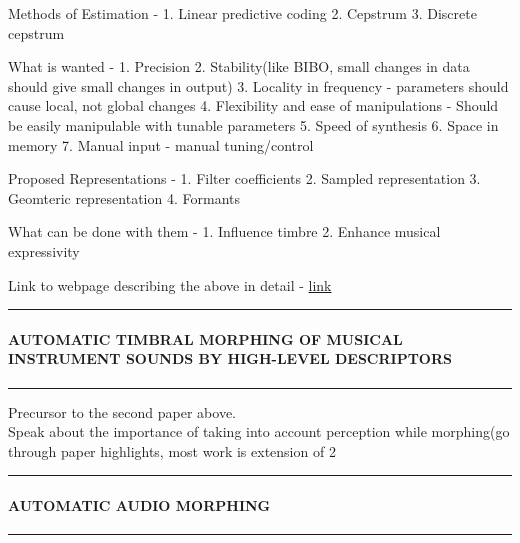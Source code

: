 \documentclass[11pt]{article}
\begin{document}
    Methods of Estimation - 1. Linear predictive coding 2. Cepstrum 3.
Discrete cepstrum

What is wanted - 1. Precision 2. Stability(like BIBO, small changes in
data should give small changes in output) 3. Locality in frequency -
parameters should cause local, not global changes 4. Flexibility and
ease of manipulations - Should be easily manipulable with tunable
parameters 5. Speed of synthesis 6. Space in memory 7. Manual input -
manual tuning/control

Proposed Representations - 1. Filter coefficients 2. Sampled
representation 3. Geomteric representation 4. Formants

    What can be done with them - 1. Influence timbre 2. Enhance musical
expressivity

Link to webpage describing the above in detail -
\href{http://recherche.ircam.fr/anasyn/schwarz/publications/icmc1999/se99-poster.html}{link}

    \begin{center}\rule{0.5\linewidth}{\linethickness}\end{center}

\paragraph{AUTOMATIC TIMBRAL MORPHING OF MUSICAL INSTRUMENT SOUNDS BY
HIGH-LEVEL
DESCRIPTORS}\label{automatic-timbral-morphing-of-musical-instrument-sounds-by-high-level-descriptors}

\begin{center}\rule{0.5\linewidth}{\linethickness}\end{center}

    Precursor to the second paper above.\\
Speak about the importance of taking into account perception while
morphing(go through paper highlights, most work is extension of 2

    \begin{center}\rule{0.5\linewidth}{\linethickness}\end{center}

\paragraph{AUTOMATIC AUDIO MORPHING}\label{automatic-audio-morphing}

\begin{center}\rule{0.5\linewidth}{\linethickness}\end{center}
\end{document}

